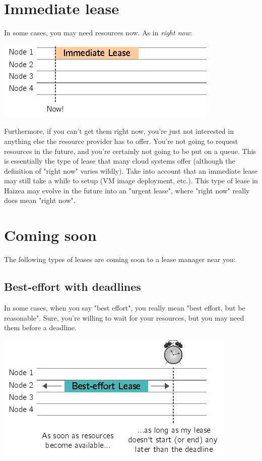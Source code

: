 \section{Immediate lease}

In some cases, you may need resources now. As in \emph{right now}:

\begin{center}
\includegraphics{images/lease_im.png}
\end{center}


Furthermore, if you can't get them right now, you're just not interested in anything else the resource provider has to offer. You're not going to request resources in the future, and you're certainly not going to be put on a queue. This is essentially the type of lease that many cloud systems offer (although the definition of "right now" varies wildly). Take into account that an immediate lease may still take a while to setup (VM image deployment, etc.). This type of lease in Haizea may evolve in the future into an "urgent lease", where "right now" really does mean "right now".

\section{Coming soon}

The following types of leases are coming soon to a lease manager near you:

\subsection{Best-effort with deadlines}

In some cases, when you say "best effort", you really mean "best effort, but be reasonable". Sure, you're willing to wait for your resources, but you may need them before a deadline.

\begin{center}
\includegraphics{images/lease_deadline.png}
\end{center}


